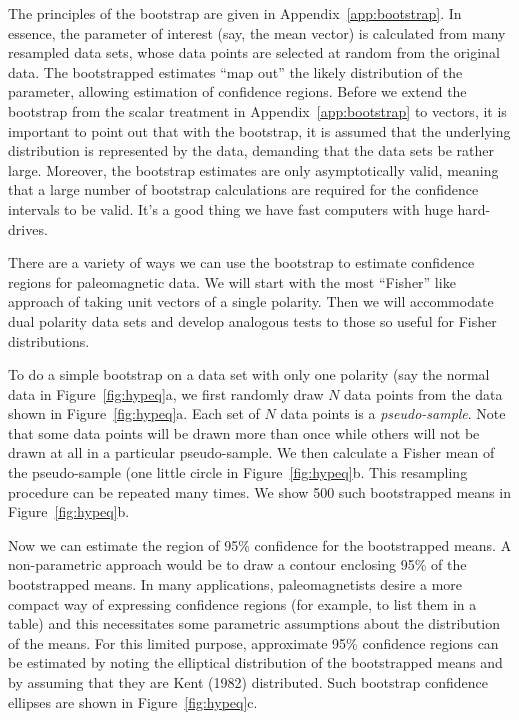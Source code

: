 The principles of the bootstrap  are given in Appendix~\ref{app:bootstrap}.  In essence, the parameter of interest (say, the mean vector) is calculated from many resampled data sets, whose data points are selected at random from  the original data.   The bootstrapped estimates ``map out'' the likely distribution of the parameter, allowing estimation of confidence regions.   Before we extend the bootstrap from the scalar treatment in Appendix~\ref{app:bootstrap}  to vectors, it is important to point out that  with the bootstrap, it is assumed that the underlying distribution is
represented by the data, demanding that the data sets be rather
large.   Moreover, the bootstrap estimates are only asymptotically
valid, meaning that a large number of bootstrap calculations are required
for the confidence intervals to be valid.    It's a good thing we have fast computers with huge hard-drives.


 
There are a variety of ways we can use the bootstrap to estimate confidence regions for paleomagnetic data.  We will start with the most ``Fisher'' like approach of taking unit vectors of a single polarity.  Then we will accommodate dual polarity data sets and develop analogous tests to those so useful for Fisher distributions.  

To do a simple 
bootstrap on a data set with only one polarity (say the normal data in Figure~\ref{fig:hypeq}a,  we first 
 randomly draw $N$ data points from the data shown in
Figure~\ref{fig:hypeq}a.  
Each set of $N$ data points is a {\it pseudo-sample}. Note that some data points will be drawn more than once while others will not be drawn at all in a particular pseudo-sample.  We then calculate a Fisher mean of the pseudo-sample (one little circle in Figure~\ref{fig:hypeq}b.  This resampling procedure can be repeated many times.  We show 500 such bootstrapped means in Figure~\ref{fig:hypeq}b.    
 
Now we can estimate the region of 95\% confidence for the
bootstrapped means.  A non-parametric approach would be to
draw a contour enclosing 95\% of the bootstrapped means.   In many applications,
paleomagnetists desire a more compact way of expressing
confidence regions (for example, to list them in a table)
and this necessitates some parametric assumptions
about the distribution of the means.   For this limited purpose,
approximate 95\% confidence regions can be estimated by noting the elliptical distribution of the bootstrapped means and by assuming that they are  
\nocite{kent82}
Kent (1982) distributed.  Such bootstrap confidence ellipses are shown in Figure~\ref{fig:hypeq}c.  

